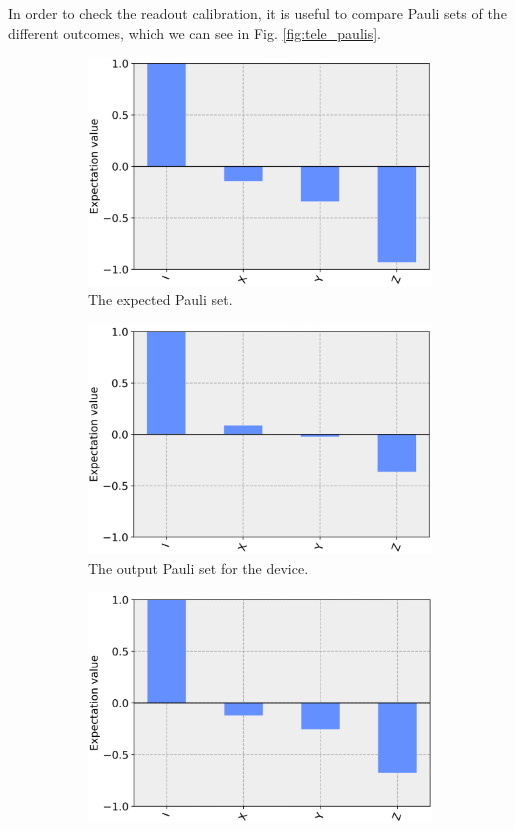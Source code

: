 In order to check the readout calibration, it is useful to compare Pauli sets of
the different outcomes, which we can see in Fig. \ref{fig:tele_paulis}.

\begin{figure}
  \begin{subfigure}{.5\textwidth} \centering %
\includegraphics[width=.8\linewidth]{images/results/tele_pauli_sim.png}
    \caption{The expected Pauli set.}
    \label{fig:tele_pauli_sim}
  \end{subfigure} \newline
  \begin{subfigure}{.5\textwidth} \centering %
\includegraphics[width=.8\linewidth]{images/results/tele_pauli_dev.png}
    \caption{The output Pauli set for the device.}
    \label{fig:tele_pauli_dev}
  \end{subfigure} \newline
  \begin{subfigure}{.5\textwidth} \centering %
\includegraphics[width=.8\linewidth]{images/results/tele_pauli_cal.png}

\end{subfigure}
\end{figure}
